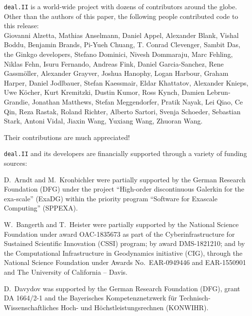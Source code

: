 \documentclass{ansarticle-preprint}
\newcommand{\specialword}[1]{\texttt{#1}}
\newcommand{\dealii}{{\specialword{deal.II}}\xspace}
\begin{document}
\dealii is a world-wide project with dozens of contributors around the
globe. Other than the authors of this paper, the following people contributed code to
this release:\\
%
%
  Giovanni Alzetta,
  Mathias Anselmann,
  Daniel Appel,
  Alexander Blank,
  Vishal Boddu,
  Benjamin Brands,
  Pi-Yueh Chuang,
  T. Conrad Clevenger,
  Sambit Das,
  the Ginkgo developers,
  Stefano Dominici,
  Nivesh Dommaraju,
  Marc Fehling,
  Niklas Fehn,
  Isuru Fernando,
  Andreas Fink,
  Daniel Garcia-Sanchez,
  Rene Gassm{\"o}ller,
  Alexander Grayver,
  Joshua Hanophy,
  Logan Harbour,
  Graham Harper,
  Daniel Jodlbauer,
  Stefan Kaessmair,
  Eldar Khattatov,
  Alexander Knieps,
  Uwe K{\"o}cher,
  Kurt Kremitzki,
  Dustin Kumor,
  Ross Kynch,
  Damien Lebrun-Grandie,
  Jonathan Matthews,
  Stefan Meggendorfer,
  Pratik Nayak,
  Lei Qiao,
  Ce Qin,
  Reza Rastak,
  Roland Richter,
  Alberto Sartori,
  Svenja Schoeder,
  Sebastian Stark,
  Antoni Vidal,
  Jiaxin Wang,
  Yuxiang Wang,
  Zhuoran Wang.

Their contributions are much appreciated!


\bigskip

\dealii and its developers are financially supported through a
variety of funding sources:

D.~Arndt and M.~Kronbichler were partially supported by the German
Research Foundation (DFG) under the project ``High-order discontinuous
Galerkin for the exa-scale'' (\mbox{ExaDG}) within the priority program ``Software
for Exascale Computing'' (SPPEXA).

W.~Bangerth and T.~Heister were partially
supported by the National Science Foundation under award OAC-1835673
as part of the Cyberinfrastructure for Sustained Scientific Innovation (CSSI)
program; by award DMS-1821210; and by the Computational Infrastructure
in Geodynamics initiative (CIG), through the National Science
Foundation under Awards No.~EAR-0949446 and EAR-1550901 and The
University of California -- Davis.

D.~Davydov was supported by the German Research Foundation (DFG), grant DA
1664/2-1 and the Bayerisches Kompetenznetzwerk
f\"ur Technisch-Wissenschaftliches Hoch- und H\"ochstleistungsrechnen
(KONWIHR).
\end{document}
